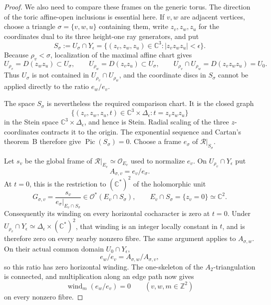 \begin{proof}
We also need to compare these frames on the generic torus.  The direction
of the toric affine-open inclusions is essential here.  If \(v,w\) are
adjacent vertices, choose a triangle \(\sigma=\{v,w,u\}\) containing them,
write \(z_v,z_w,z_u\) for the coordinates dual to its three height-one ray
generators, and put
\[
 S_\sigma:=U_\sigma\cap Y_\epsilon
 =\{(z_v,z_w,z_u)\in\mathbb C^3:
       |z_vz_wz_u|<\epsilon\}.
\tag{W.135}\label{wbII:eq:W:5.17-A34a}
\]
Because \(\rho_v<\sigma\), localization of the maximal affine chart gives
\begin{equation}
 U_{\rho_v}=D(z_wz_u)\subset U_\sigma,\qquad
 U_{\rho_w}=D(z_vz_u)\subset U_\sigma,\qquad
 U_{\rho_v}\cap U_{\rho_w}=D(z_vz_wz_u)=U_0.
\label{wbII:eq:analytic-toric-open-directions}
\end{equation}
Thus \(U_\sigma\) is not contained in \(U_{\rho_v}\cap U_{\rho_w}\), and
the coordinate discs in \(S_\sigma\) cannot be applied directly to the
ratio \(e_w/e_v\).

The space \(S_\sigma\) is nevertheless the required comparison chart.  It
is the closed graph
\[
 \{(z_v,z_w,z_u,t)\in\mathbb C^3\times\Delta_\epsilon:
   t=z_vz_wz_u\}
\]
in the Stein space \(\mathbb C^3\times\Delta_\epsilon\), and hence is
Stein.  Radial scaling of the three \(z\)-coordinates contracts it to the
origin.  The exponential sequence and Cartan's theorem~B therefore give
\(\operatorname{Pic}(S_\sigma)=0\).  Choose a frame \(e_\sigma\) of
\(\mathcal R|_{S_\sigma}\).

Let \(s_v\) be the global frame of
\(\mathcal R|_{E_v}\simeq\mathcal O_{E_v}\) used to normalize \(e_v\).
On \(U_{\rho_v}\cap Y_\epsilon\) put
\[
 A_{\sigma,v}=e_v/e_\sigma.
\]
At \(t=0\), this is the restriction to \((\mathbb C^*)^2\) of the
holomorphic unit
\[
 G_{\sigma,v}
 =\frac{s_v}{e_\sigma|_{E_v\cap S_\sigma}}
 \in\mathcal O^*(E_v\cap S_\sigma),
 \qquad E_v\cap S_\sigma=\{z_v=0\}\simeq\mathbb C^2.
\]
Consequently its winding on every horizontal cocharacter is zero at
\(t=0\).  Under
\(U_{\rho_v}\cap Y_\epsilon\simeq
\Delta_\epsilon\times(\mathbb C^*)^2\), that winding is an integer locally
constant in \(t\), and is therefore zero on every nearby nonzero fibre.
The same argument applies to \(A_{\sigma,w}\).  On their actual common
domain \(U_0\cap Y_\epsilon\),
\[
 e_w/e_v=A_{\sigma,w}/A_{\sigma,v},
\]
so this ratio has zero horizontal winding.  The one-skeleton of the
\(A_2\)-triangulation is connected, and multiplication along an edge path
now gives
\[
 \operatorname{wind}_m(e_w/e_v)=0
 \qquad(v,w,m\in\mathbb Z^2)
\tag{W.136}\label{wbII:eq:W:5.17-A34b}
\]
on every nonzero fibre.


\end{proof}
